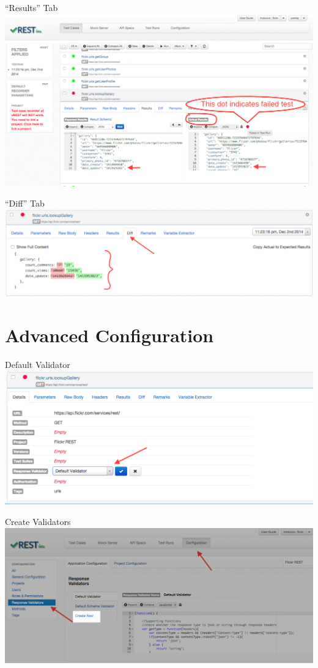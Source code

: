 \documentclass{beamer}
\begin{document}
\begin{frame}{``Results'' Tab}
    \includegraphics[scale=0.30]{images/actual_result.PNG}
\end{frame}
\begin{frame}{``Diff'' Tab}
    \includegraphics[scale=0.30]{images/view_diff_after_filter.PNG}
\end{frame}

\section{Advanced Configuration}
\begin{frame}{Default Validator}
    \includegraphics[scale=0.30]{images/default_validator.PNG}
\end{frame}
\begin{frame}{Create Validators}
    \includegraphics[scale=0.30]{images/create_validators.PNG}
\end{frame}
\end{document}
